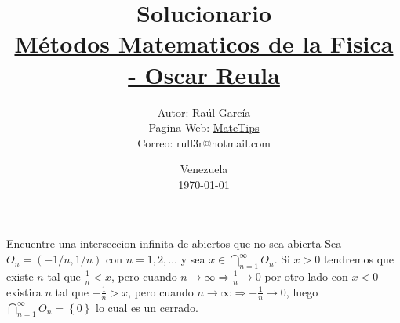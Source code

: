 \documentclass[10pt,a4paper]{jhwhw}
\author{Autor: \href{https://www.facebook.com/ruller}{Raúl García}\\Pagina Web: \href{https://rull3r.github.io/}{MateTips}\\Correo: rull3r@hotmail.com}
\date{Venezuela\\ \today \\}
\title{Solucionario \\\href{https://books.google.co.ve/books?id=i4aToAEACAAJ}{Métodos Matematicos de la Fisica - Oscar Reula}\\}
\begin{document}
	
	\problema{ }\label{pro:1}
	Encuentre una interseccion infinita de abiertos que no sea abierta
	\solution 
	Sea $O_n=\left( -1/n , 1/n\right) $ con $n=1,2,\ldots$ y sea $x \in \bigcap_{n=1}^{\infty}{O_n}$. Si $x>0$ tendremos que existe $n$ tal que $\frac{1}{n}<x$, pero cuando $n\rightarrow \infty\Rightarrow\frac{1}{n}\rightarrow0$ por otro lado con $x<0$ existira $n$ tal que $-\frac{1}{n}>x$, pero cuando $n\rightarrow \infty\Rightarrow-\frac{1}{n}\rightarrow0$, luego $\bigcap_{n=1}^{\infty}{O_n}=\left\lbrace 0\right\rbrace $ lo cual es un cerrado. \QEPD
	
\end{document}
